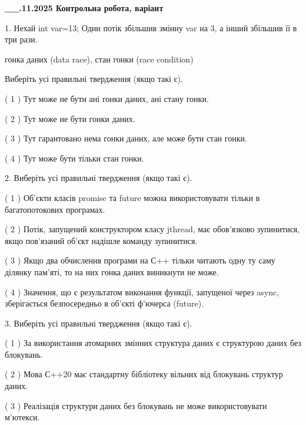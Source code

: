 \documentclass[12pt, ukrainian]{article}
\begin{document}
\newpage
\begin {large}

\textbf{\_\_.11.2025 Контрольна робота, варіант  }\par


{
1. Нехай int var=13; Один потік збільшив змінну var на 3, а інший збільшив її в три рази.

гонка даних (data race), стан гонки (race condition)

Виберіть усі правильні твердження (якщо такі є).\par
\vspace{2mm}
( 1 ) Тут може не бути ані гонки даних, ані стану гонки.%

( 2 ) Тут може не бути гонки даних.%

( 3 ) Тут гарантовано нема гонки даних, але може бути стан гонки.%

( 4 ) Тут може бути тільки стан гонки.%


2. Виберіть усі правильні твердження (якщо такі є).\par
\vspace{2mm}

( 1 ) Об’єкти класів promise та future можна використовувати тільки в багатопотокових програмах.%

( 2 ) Потік, запущений конструктором класу jthread, має обов’язково зупинитися, якщо пов’язаний об’єкт надішле команду зупинитися.%

( 3 ) Якщо два обчислення програми на С++ тільки читають одну ту саму ділянку пам'яті, то на них гонка даних  виникнути не може.%

( 4 ) Значення, що є результатом виконання функції, запущеної через async, зберігається безпосередньо в об’єкті ф’ючерса (future).%


3. Виберіть усі правильні твердження (якщо такі є).\par
\vspace{2mm}

( 1 ) За використання атомарних змінних структура даних є структурою даних без блокувань.%

( 2 ) Мова С++20 має стандартну бібліотеку вільних від блокувань структур даних.%

( 3 ) Реалізація структури даних без блокувань не може використовувати м’ютекси.%

}
\end{large}
\end{document}
